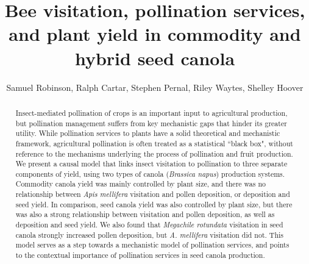 \documentclass[12pt, draft]{article} %
\title{Bee visitation, pollination services, and plant yield in commodity and hybrid seed canola}
\author{Samuel Robinson, Ralph Cartar, Stephen Pernal, Riley Waytes, Shelley Hoover}
\date{}
\begin{document}
\maketitle
\doublespacing

\begin{abstract}
Insect-mediated pollination of crops is an important input to agricultural production, but pollination management suffers from key mechanistic gaps that hinder its greater utility. 
While pollination services to plants have a solid theoretical and mechanistic framework, agricultural pollination is often treated as a statistical ``black box", without reference to the mechanisms underlying the process of pollination and fruit production.
We present a causal model that links insect visitation to pollination to three separate components of yield, using two types of canola (\textit{Brassica napus}) production systems.
Commodity canola yield was mainly controlled by plant size, and there was no relationship between \textit{Apis mellifera} visitation and pollen deposition, or deposition and seed yield.
In comparison, seed canola yield was also controlled by plant size, but there was also a strong relationship between visitation and pollen deposition, as well as deposition and seed yield.
We also found that \textit{Megachile rotundata} visitation in seed canola strongly increased pollen deposition, but \textit{A. mellifera} visitation did not.
This model serves as a step towards a mechanistic model of pollination services, and points to the contextual importance of pollination services in seed canola production.

\end{abstract}

    
\end{document}
